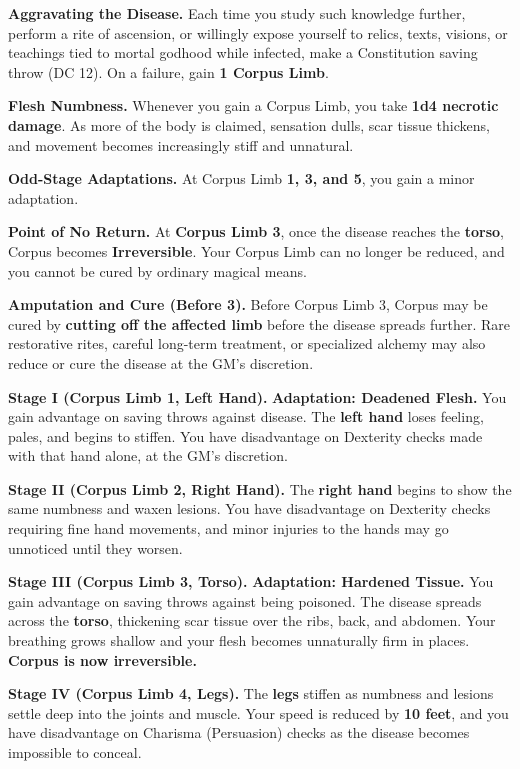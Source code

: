\documentclass[letterpaper,twocolumn,openany,nodeprecatedcode,breakable,skins,xparse,most]{dndbook}
\begin{document}
\textbf{Aggravating the Disease.} Each time you study such knowledge further, perform a rite of ascension, or willingly expose yourself to relics, texts, visions, or teachings tied to mortal godhood while infected, make a Constitution saving throw (DC 12). On a failure, gain \textbf{1 Corpus Limb}.

\textbf{Flesh Numbness.} Whenever you gain a Corpus Limb, you take \textbf{1d4 necrotic damage}. As more of the body is claimed, sensation dulls, scar tissue thickens, and movement becomes increasingly stiff and unnatural.

\textbf{Odd-Stage Adaptations.} At Corpus Limb \textbf{1, 3, and 5}, you gain a minor adaptation.

\textbf{Point of No Return.} At \textbf{Corpus Limb 3}, once the disease reaches the \textbf{torso}, Corpus becomes \textbf{Irreversible}. Your Corpus Limb can no longer be reduced, and you cannot be cured by ordinary magical means.

\textbf{Amputation and Cure (Before 3).} Before Corpus Limb 3, Corpus may be cured by \textbf{cutting off the affected limb} before the disease spreads further. Rare restorative rites, careful long-term treatment, or specialized alchemy may also reduce or cure the disease at the GM's discretion.

\medskip

\textbf{Stage I (Corpus Limb 1, Left Hand).} \textbf{Adaptation: Deadened Flesh.} You gain advantage on saving throws against disease.
The \textbf{left hand} loses feeling, pales, and begins to stiffen. You have disadvantage on Dexterity checks made with that hand alone, at the GM's discretion.

\textbf{Stage II (Corpus Limb 2, Right Hand).} The \textbf{right hand} begins to show the same numbness and waxen lesions. You have disadvantage on Dexterity checks requiring fine hand movements, and minor injuries to the hands may go unnoticed until they worsen.

\textbf{Stage III (Corpus Limb 3, Torso).} \textbf{Adaptation: Hardened Tissue.} You gain advantage on saving throws against being poisoned.
The disease spreads across the \textbf{torso}, thickening scar tissue over the ribs, back, and abdomen. Your breathing grows shallow and your flesh becomes unnaturally firm in places. \textbf{Corpus is now irreversible.}

\textbf{Stage IV (Corpus Limb 4, Legs).} The \textbf{legs} stiffen as numbness and lesions settle deep into the joints and muscle. Your speed is reduced by \textbf{10 feet}, and you have disadvantage on Charisma (Persuasion) checks as the disease becomes impossible to conceal.
\end{document}
